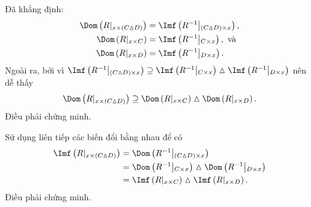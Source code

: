 \stepSubexercise Đã khẳng định:
\begin{align*}
   \Dom\left(R|_{x \times (C \vartriangle D)}\right) &= \Imf\left(R^{-1}\middle|_{(C \vartriangle D) \times x}\right), \\
   \Dom\left(R|_{x \times C}\right) &= \Imf\left(R^{-1}\middle|_{C \times x}\right),\text{~và} \\
   \Dom\left(R|_{x \times D}\right) &= \Imf\left(R^{-1}\middle|_{D \times x}\right).
\end{align*}
Ngoài ra, bởi vì $\Imf\left(R^{-1}\middle|_{(C \vartriangle D) \times x}\right) \supseteq \Imf\left(R^{-1}\middle|_{C \times x}\right) \vartriangle \Imf\left(R^{-1}\middle|_{D \times x}\right)$ nên dễ thấy \begin{equation*}
   \Dom\left(R|_{x \times (C \vartriangle D)}\right) \supseteq \Dom\left(R|_{x \times C}\right) \vartriangle \Dom\left(R|_{x \times D}\right).
\end{equation*}
Điều phải chứng minh.

\stepSubexercise Sử dụng liên tiếp các biến đổi bằng nhau để có \begin{align*}
   \Imf\left(R|_{x \times (C \vartriangle D)}\right) &= \Dom\left(R^{-1}\middle|_{(C \vartriangle D) \times x}\right) \\
   &= \Dom\left(R^{-1}\middle|_{C \times x}\right) \vartriangle \Dom\left(R^{-1}\middle|_{D \times x}\right) \\
   &= \Imf\left(R|_{x \times C}\right) \vartriangle \Imf\left(R|_{x \times D}\right).
\end{align*}
Điều phải chứng minh.

